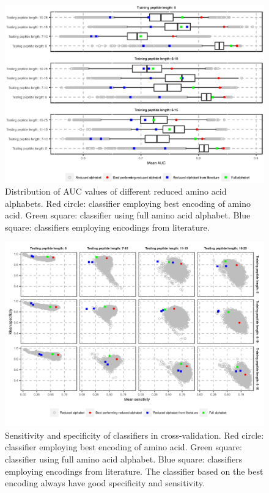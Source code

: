 \documentclass{bioinfo}
\begin{document}
\begin{figure}[!tpb]
\centerline{\includegraphics{figures/AUC_boxplot.eps}}
\caption{Distribution of AUC values of different reduced amino acid alphabets. 
Red circle: classifier employing best encoding of amino acid. Green square: 
classifier using full amino acid alphabet. Blue square: classifiers employing 
encodings from literature.}\label{fig:AUC_boxplot} 
\end{figure}

\begin{figure}[!tpb]
\centerline{\includegraphics{figures/sesp_plot.png}}
\caption{Sensitivity and specificity of classifiers in cross-validation. Red 
circle: classifier employing best encoding of amino acid. Green square: 
classifier using full amino acid alphabet. Blue square: classifiers employing 
encodings from literature. The classifier based on the best encoding always 
have 
good specificity and sensitivity.}\label{fig:sesp_plot}
\end{figure}
\end{document}
